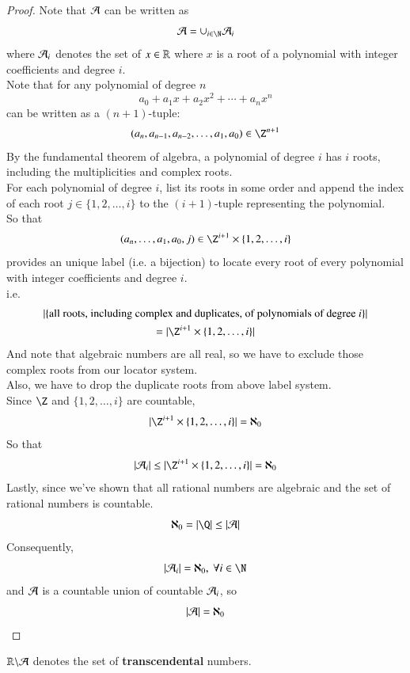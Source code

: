 \documentclass[10pt]{article}
\begin{document}
		\begin{proof}
			Note that $\mathcal{{A}}$ can be written as
			\[
				\mc{A} = \cup_{i \in \N} \mc{A}_i
			\]
			where $\mathcal{{A}}_i$ denotes the set of $x \in \mathbb{R}$ where $x$ is a root of a polynomial with integer coefficients and degree $i$. \\
			Note that for any polynomial of degree $n$
			\[
				a_0 + a_1 x + a_2 x^2 + \cdots + a_n x^n
			\]
			can be written as a $(n + 1)$-tuple:
			\[
				(a_n, a_{n-1}, a_{n-2}, \dots, a_1, a_0) \in \Z^{n+1}
			\]
			By the fundamental theorem of algebra, a polynomial of degree $i$ has $i$ roots, including the multiplicities and complex roots. \\
			For each polynomial of degree $i$, list its roots in some order and append the index of each root $j \in \{1,2,\dots,i\}$ to the $(i+1)$-tuple representing the polynomial. \\
			So that 
			\[
				(a_n, \dots, a_1, a_0, j) \in \Z^{i+1}\times \{1,2,\dots,i\}
			\]
			provides an unique label (i.e. a bijection) to locate every root of every polynomial with integer coefficients and degree $i$. \\
			i.e.
			\begin{gather*}
				|\{\tx{all roots, including complex and duplicates, of polynomials of degree $i$}\}| \\
				= |\Z^{i+1}\times \{1,2,\dots,i\}|
			\end{gather*}
			And note that algebraic numbers are all real, so we have to exclude those complex roots from our locator system. \\
			Also, we have to drop the duplicate roots from above label system. \\
			Since $\Z$ and $\{1,2,\dots,i\}$ are countable,
			\[
				|\Z^{i+1}\times \{1,2,\dots,i\}| = \aleph_0
			\]
			So that 
			\[
				|\mc{A}_i| \leq |\Z^{i+1}\times \{1,2,\dots,i\}| = \aleph_0
			\]
			Lastly, since we've shown that all rational numbers are algebraic and the set of rational numbers is countable. 
			\[
				\aleph_0 = |\Q| \leq |\mc{A}|
			\]
			Consequently,
			\[
				|\mc{A}_i| = \aleph_0,\ \forall i \in \N
			\]
			and $\mathcal{{A}}$ is a countable union of countable $\mathcal{{A}}_i$, so 
			\[
				|\mathcal{{A}}| = \aleph_0
			\]
		\end{proof}
		
		\begin{notation}
			$\mathbb{R} \backslash \mathcal{{A}}$ denotes the set of \textbf{transcendental} numbers.
		\end{notation}
		
\end{document}

